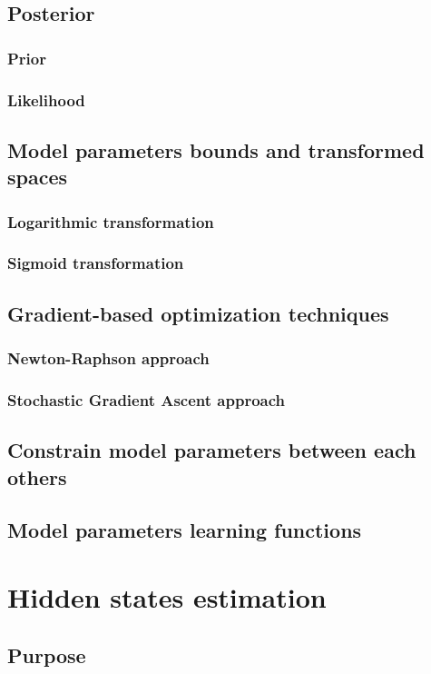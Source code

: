 \documentclass{article}
\begin{document}
\subsection{Posterior}
\subsubsection{Prior}
\subsubsection{Likelihood}
\subsection{Model parameters bounds and transformed spaces}
\subsubsection{Logarithmic transformation}
\subsubsection{Sigmoid transformation}
\subsection{Gradient-based optimization techniques}
\subsubsection{Newton-Raphson approach}
\subsubsection{Stochastic Gradient Ascent approach}
\subsection{Constrain model parameters between each others}
\subsection{Model parameters learning functions}
\newpage

\section{Hidden states estimation}
\subsection{Purpose}
\end{document}
